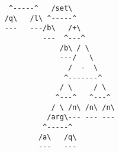 \documentclass[aip,jcp,reprint,footinbib]{revtex4-1}
\begin{document}
\begin{lstlisting}
                                           ^-----^   /set\
                                          /q\   /l\ ^-----^
                                          ---   ---/b\   /+\
                                                   ---  ^---^
                                                       /b\ / \
                                                       ---/   \
                                                         /  -  \
                                                        ^-------^
                                                       / \     / \
                                                      ^---^   ^---^
                                                     / \ /n\ /n\ /n\
                                                    /arg\--- --- ---
                                                   ^-----^
                                                  /a\   /q\
                                                  ---   ---
\end{lstlisting}
\end{document}

